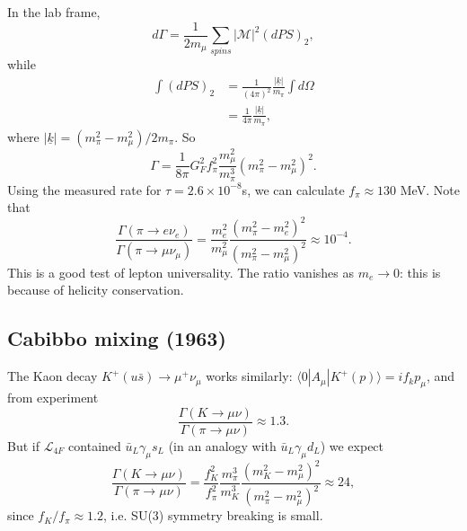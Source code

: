 \documentclass[a4paper,12pt]{article}
\begin{document}
In the lab frame,
\begin{equation}
    d\Gamma = \frac{1}{2m_\mu} \sum_{spins} |\mathcal{M}|^2(dPS)_2,
\end{equation}
while
\begin{equation}
\begin{split}
\int(dPS)_2 &= \frac{1}{(4\pi)^2} \frac{|\underline{k}|}{m_\pi} \int d\Omega \\
&= \frac{1}{4\pi}\frac{|\underline{k}|}{m_\pi},
\end{split}
\end{equation}
where $|\underline{k}| = (m_\pi^2 - m_\mu^2)/2m_\pi$. So
\begin{equation}
\Gamma = \frac{1}{8\pi} G_F^2f_\pi^2 \frac{m_\mu^2}{m_\pi^3}(m_\pi^2 - m_\mu^2)^2.
\end{equation}
Using the measured rate for $\tau = 2.6 \times 10^{-8}$s, we can calculate $f_\pi \approx 130$ MeV. Note that 
\begin{equation}
\frac{\Gamma(\pi \to e \nu_e)}{\Gamma(\pi \to \mu \nu_\mu)} = \frac{m_e^2}{m_\mu^2}\frac{(m_\pi^2 - m_e^2)^2}{(m_\pi^2 - m_\mu^2)^2} \approx 10^{-4}.
\end{equation}
This is a good test of lepton universality. The ratio vanishes as $m_e \to 0$: this is because of helicity conservation. 
%
\subsection{Cabibbo mixing (1963)}
The Kaon decay $K^+ (u\bar{s}) \to \mu^+ \nu_\mu$ works similarly: $\langle 0 | A_\mu | K^+(p) \rangle = i f_k p_\mu$, and from experiment
\begin{equation}
    \frac{\Gamma(K \to \mu\nu)}{\Gamma(\pi \to \mu\nu)} \approx 1.3. 
\end{equation}
But if $\mathcal{L}_{4F}$ contained $\bar{u}_L \gamma_\mu s_L$ (in an analogy with $\bar{u}_L \gamma_\mu d_L$) we expect
\begin{equation}
    \frac{\Gamma(K \to \mu\nu)}{\Gamma(\pi \to \mu\nu)} = \frac{f_K^2}{f_\pi^2}\frac{m_\pi^3}{m_K^3}\frac{(m_K^2 - m_\mu^2)^2}{(m_\pi^2 - m_\mu^2)^2} \approx 24,
\end{equation}
since $f_K/f_\pi \approx 1.2$, i.e. SU(3) symmetry breaking is small.
\end{document}
